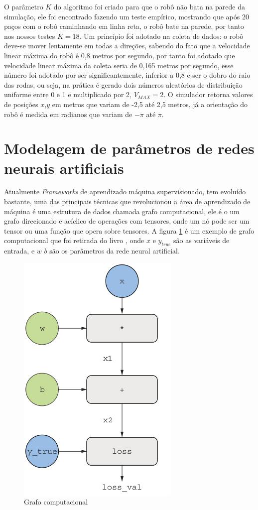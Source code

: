 O parâmetro $K$ do algoritmo foi criado para que o robô não bata na parede
da simulação, ele foi encontrado fazendo um teste empírico, mostrando que
após 20 paços  com o robô caminhando em linha reta, o robô bate na parede,
por tanto nos nossos testes $K = 18$. Um princípio foi adotado na coleta
de dados: o robô deve-se mover lentamente em todas a direções, sabendo do
fato que a velocidade linear máxima do robô é 0,8 metros por segundo,
por tanto foi adotado que velocidade linear máxima da coleta seria de 
0,165 metros por segundo, esse número foi adotado por ser significantemente,
inferior a 0,8  e ser o dobro do raio das rodas, ou seja, na prática é gerado
dois números aleatórios de distribuição uniforme entre 0 e 1 e multiplicado por
2, $V_{MAX} = 2$. O simulador retorna valores de posições $x$,$y$ em metros
que variam de -2,5 até 2,5 metros, já a orientação do robô é medida em radianos
que variam de $-\pi$ até $\pi$.

\section{Modelagem de parâmetros de redes neurais artificiais}
Atualmente \textit{Frameworks} de aprendizado máquina supervisionado,
tem evoluído bastante, uma das principais técnicas que revolucionou a
área de aprendizado de máquina é uma estrutura de dados chamada grafo
computacional, ele é o um grafo direcionado e acíclico de operações com
tensores, onde um nó pode ser um tensor ou uma função que opera sobre
tensores. A figura \ref{fig:grafo:computacional} é um exemplo de
grafo computacional que foi retirada do livro \cite{chollet2021deep},
onde $x$ e $y_{true}$ são as variáveis de entrada, e $w$ $b$ são
os parâmetros da rede neural artificial. 

\begin{figure}[H]
    \label{fig:grafo:computacional}
    \centering
    \includegraphics[scale=0.5]{figuras/grafo_computacional.png}
    \caption{Grafo computacional}
\end{figure}

